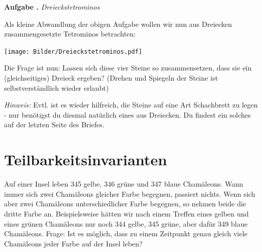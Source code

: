 \documentclass[a4paper,ngerman,12pt]{scrartcl}
\theoremstyle{definition}
\theoremstyle{plain}
\theoremstyle{remark}
\newlength{\aufgabenskip}
\newcounter{aufgabennummer}
\newenvironment{aufgabe}[1]{
	\addtocounter{aufgabennummer}{1}
	\textbf{Aufgabe \theaufgabennummer.} \emph{#1} \par
}{\vspace{\aufgabenskip}}
\begin{document}
\begin{aufgabe}{Dreieckstetrominos}
	Als kleine Abwandlung der obigen Aufgabe wollen wir nun aus Dreiecken zusammengesetzte \glqq Tetrominos\grqq{} betrachten:
	\begin{center}
		\texttt{[image: Bilder/Dreieckstetrominos.pdf]}
	\end{center}
	Die Frage ist nun: Lassen sich diese vier Steine so zusammensetzen, dass sie ein (gleichseitiges) Dreieck ergeben? (Drehen und Spiegeln der Steine ist selbstverständlich wieder erlaubt)
	
	\emph{Hinweis:} Evtl. ist es wieder hilfreich, die Steine auf eine Art \glqq Schachbrett\grqq{} zu legen - nur benötigst du diesmal natürlich eines aus Dreiecken. Du findest ein solches auf der letzten Seite des Briefes.
\end{aufgabe}


\section{Teilbarkeitsinvarianten}

Auf einer Insel leben 345 gelbe, 346 grüne und 347 blaue Chamäleons. Wann immer sich zwei Chamäleons gleicher Farbe begegnen, passiert nichts. Wenn sich aber zwei Chamäleons unterschiedlicher Farbe begegnen, so nehmen beide die dritte Farbe an. Beispielsweise hätten wir nach einem Treffen eines gelben und eines grünen Chamäleons nur noch 344 gelbe, 345 grüne, aber dafür 349 blaue Chamäleons. Frage: Ist es möglich, dass zu einem Zeitpunkt genau gleich viele Chamäleons jeder Farbe auf der Insel leben?
\end{document}
